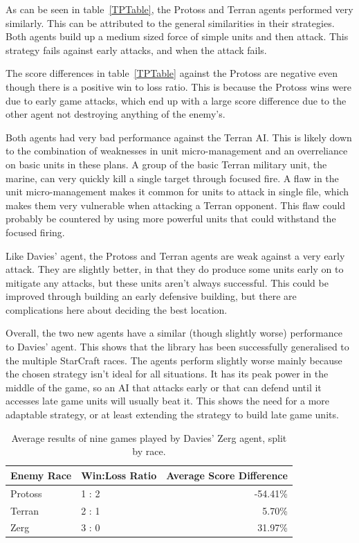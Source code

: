 \documentclass[11pt,openright,a4paper]{report}
\begin{document}
As can be seen in table~\ref{TPTable}, the Protoss and Terran agents performed very similarly. This can be attributed to the general similarities in their strategies. Both agents build up a medium sized force of simple units and then attack.  This strategy fails against early attacks, and when the attack fails.

The score differences in table~\ref{TPTable} against the Protoss are negative even though there is a positive win to loss ratio. This is because the Protoss wins were due to early game attacks, which end up with a large score difference due to the other agent not destroying anything of the enemy's.

Both agents had very bad performance against the Terran AI. This is likely down to the combination of weaknesses in unit micro-management and an overreliance on basic units in these plans. A group of the basic Terran military unit, the marine, can very quickly kill a single target through focused fire. A flaw in the unit micro-management makes it common for units to attack in single file, which makes them very vulnerable when attacking a Terran opponent. This flaw could probably be countered by using more powerful units that could withstand the focused firing.

Like Davies' agent, the Protoss and Terran agents are weak against a very early attack. They are slightly better, in that they do produce some units early on to mitigate any attacks, but these units aren't always successful. This could be improved through building an early defensive building, but there are complications here about deciding the best location.

Overall, the two new agents have a similar (though slightly worse) performance to Davies' agent. This shows that the library has been successfully generalised to the multiple StarCraft races. The agents perform slightly worse mainly because the chosen strategy isn't ideal for all situations. It has its peak power in the middle of the game, so an AI that attacks early or that can defend until it accesses late game units will usually beat it. This shows the need for a more adaptable strategy, or at least extending the strategy to build late game units.

\begin{table}[t]
  \centering
  \begin{tabular}{| l | l | r |}
    \hline
    Enemy Race & Win:Loss Ratio & Average Score Difference \\ \hline
    Protoss & 1 : 2 & -54.41\% \\ \hline
    Terran  & 2 : 1 & 5.70\% \\ \hline
    Zerg    & 3 : 0 & 31.97\% \\ \hline
  \end{tabular}
  \caption{Average results of nine games played by Davies' Zerg agent, split by race.}
  \label{ZergTable}
\end{table}
\end{document}

